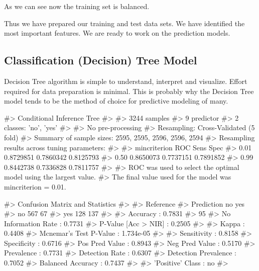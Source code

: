As we can see now the training set is balanced.

Thus we have prepared our training and test data sets. We have
identified the most important features. We are ready to work on the
prediction models.

\hypertarget{classification-decision-tree-model}{%
\subsection{Classification (Decision) Tree
Model}\label{classification-decision-tree-model}}

Decision Tree algorithm is simple to understand, interpret and
visualize. Effort required for data preparation is minimal. This is
probably why the Decision Tree model tends to be the method of choice
for predictive modeling of many.

\begin{Schunk}
\begin{Soutput}
#> Conditional Inference Tree 
#> 
#> 3244 samples
#>    9 predictor
#>    2 classes: 'no', 'yes' 
#> 
#> No pre-processing
#> Resampling: Cross-Validated (5 fold) 
#> Summary of sample sizes: 2595, 2595, 2596, 2596, 2594 
#> Resampling results across tuning parameters:
#> 
#>   mincriterion  ROC        Sens       Spec     
#>   0.01          0.8729851  0.7860342  0.8125793
#>   0.50          0.8650073  0.7737151  0.7891852
#>   0.99          0.8442738  0.7336828  0.7811757
#> 
#> ROC was used to select the optimal model using the largest value.
#> The final value used for the model was mincriterion = 0.01.
\end{Soutput}
\end{Schunk}

\begin{Schunk}
\begin{Soutput}
#> Confusion Matrix and Statistics
#> 
#>           Reference
#> Prediction  no yes
#>        no  567  67
#>        yes 128 137
#>                                           
#>                Accuracy : 0.7831          
#>                  95%
#>     No Information Rate : 0.7731          
#>     P-Value [Acc > NIR] : 0.2505          
#>                                           
#>                   Kappa : 0.4408          
#>  Mcnemar's Test P-Value : 1.734e-05       
#>                                           
#>             Sensitivity : 0.8158          
#>             Specificity : 0.6716          
#>          Pos Pred Value : 0.8943          
#>          Neg Pred Value : 0.5170          
#>              Prevalence : 0.7731          
#>          Detection Rate : 0.6307          
#>    Detection Prevalence : 0.7052          
#>       Balanced Accuracy : 0.7437          
#>                                           
#>        'Positive' Class : no              
#> 
\end{Soutput}
\end{Schunk}

